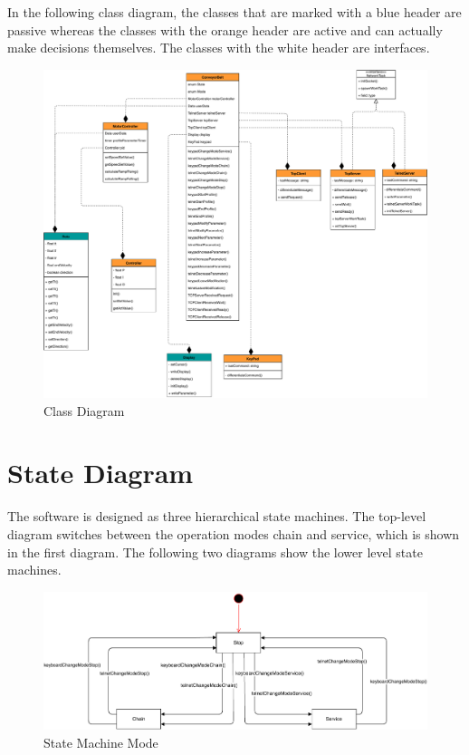 \documentclass[a4paper,12pt,twoside]{scrreprt}
\begin{document}
In the following class diagram, the classes that are marked with a blue header are passive whereas the classes with the orange header are active and can actually make decisions themselves. The classes with the white header are interfaces. 

\begin{figure}[H]
	\centering
	\includegraphics[width=\textwidth,height=\textheight,keepaspectratio]{classDiagram/ClassDiagram.pdf}
	\caption[Class Diagram]{Class Diagram}
	\label{fig:ClassDiagram}
\end{figure}

\section{State Diagram}
\label{chap:State_Diagram}

The software is designed as three hierarchical state machines. The top-level diagram switches between the operation modes chain and service, which is shown in the first diagram. The following two diagrams show the lower level state machines. 

\begin{figure}[H]
	\centering
	\includegraphics[width=\textwidth,height=\textheight,keepaspectratio]{stateDiagram/StateMachineMode.pdf}
	\caption[State Machine Mode]{State Machine Mode}
	\label{fig:StateMachineMode}
\end{figure}
\newpage
\end{document}
